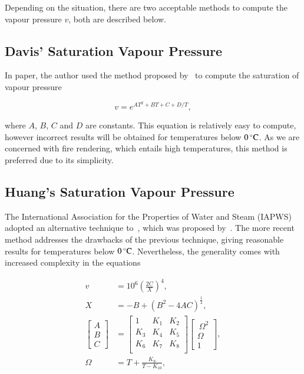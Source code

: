 Depending on the situation, there are two acceptable methods to compute the vapour pressure $v$, both are described below.

\subsection{Davis' Saturation Vapour Pressure}
\label{subsec:davis_v}

In \cite{Ciddor:1996} paper, the author used the method proposed by~\cite{Davis:1992} to compute the saturation of vapour pressure

\begin{equation}
\label{eq:davis_v}
v = e^{AT^2 + BT + C + D/T},
\end{equation}

where $A$, $B$, $C$ and $D$ are constants.
This equation is relatively easy to compute, however incorrect results will be obtained for temperatures below $0\,^{\circ}{\rm C}$.
As we are concerned with fire rendering, which entails high temperatures, this method is preferred due to its simplicity.

\subsection{Huang's Saturation Vapour Pressure}
\label{subsec:huang_v}

The International Association for the Properties of Water and Steam (IAPWS) adopted an alternative technique to~\cite{Davis:1992}, which was proposed by~\cite{Huang:1998}.
The more recent method addresses the drawbacks of the previous technique, giving reasonable results for temperatures below $0\,^{\circ}{\rm C}$.
Nevertheless, the generality comes with increased complexity in the equations

\begin{align}
\label{eq:huang_v}
v &= 10^{6} \left( \frac{2C}{X} \right)^4, \\
X &= -B + \left( B^2 - 4AC \right)^{\frac{1}{2}}, \\
\begin{bmatrix}
A \\
B \\
C
\end{bmatrix} &=
\begin{bmatrix}
1 & K_1 & K_2 \\
K_3 & K_4 & K_5 \\
K_6 & K_7 & K_8 \\
\end{bmatrix} 
\begin{bmatrix}
~\Omega^2 \\
\Omega \\
1
\end{bmatrix}, \\
\Omega &= T + \frac{K_9}{T - K_{10}},
\end{align}

